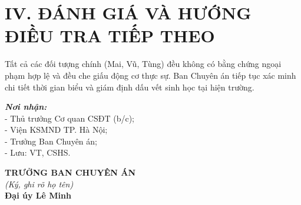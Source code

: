 \documentclass[12pt,a4paper]{article}
\begin{document}
\section*{IV. ĐÁNH GIÁ VÀ HƯỚNG ĐIỀU TRA TIẾP THEO}
Tất cả các đối tượng chính (Mai, Vũ, Tùng) đều không có bằng chứng ngoại phạm hợp lệ và đều che giấu động cơ thực sự. Ban Chuyên án tiếp tục xác minh chi tiết thời gian biểu và giám định dấu vết sinh học tại hiện trường.

\vspace{0.8cm}

\noindent
\begin{minipage}[t]{0.45\textwidth}
    \small
    \textbf{\textit{Nơi nhận:}}\\
    - Thủ trưởng Cơ quan CSĐT (b/c);\\
    - Viện KSMND TP. Hà Nội;\\
    - Trưởng Ban Chuyên án;\\
    - Lưu: VT, CSHS.
\end{minipage}
\hfill
\begin{minipage}[t]{0.5\textwidth}
    \begin{center}
        \small
        \textbf{TRƯỞNG BAN CHUYÊN ÁN}\\
        \textit{(Ký, ghi rõ họ tên)}\\[1.5cm]
        \textbf{Đại úy Lê Minh}
    \end{center}
\end{minipage}
\end{document}
